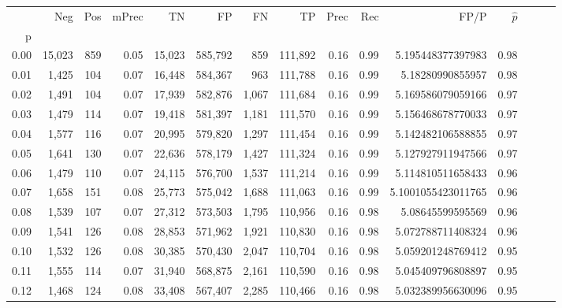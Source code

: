 \begin{tabular}{rrrrrrrrrrrrrrr}
\toprule
{} &     Neg &    Pos & mPrec &       TN &       FP &       FN &       TP &  Prec &   Rec &                 FP/P & $\hat{p}$ \\
p    &         &        &       &          &          &          &          &       &       &                      &           \\
\midrule
0.00 &  15,023 &    859 &  0.05 &   15,023 &  585,792 &      859 &  111,892 &  0.16 &  0.99 &    5.195448377397983 &      0.98 \\
0.01 &   1,425 &    104 &  0.07 &   16,448 &  584,367 &      963 &  111,788 &  0.16 &  0.99 &     5.18280990855957 &      0.98 \\
0.02 &   1,491 &    104 &  0.07 &   17,939 &  582,876 &    1,067 &  111,684 &  0.16 &  0.99 &    5.169586079059166 &      0.97 \\
0.03 &   1,479 &    114 &  0.07 &   19,418 &  581,397 &    1,181 &  111,570 &  0.16 &  0.99 &    5.156468678770033 &      0.97 \\
0.04 &   1,577 &    116 &  0.07 &   20,995 &  579,820 &    1,297 &  111,454 &  0.16 &  0.99 &    5.142482106588855 &      0.97 \\
0.05 &   1,641 &    130 &  0.07 &   22,636 &  578,179 &    1,427 &  111,324 &  0.16 &  0.99 &    5.127927911947566 &      0.97 \\
0.06 &   1,479 &    110 &  0.07 &   24,115 &  576,700 &    1,537 &  111,214 &  0.16 &  0.99 &    5.114810511658433 &      0.96 \\
0.07 &   1,658 &    151 &  0.08 &   25,773 &  575,042 &    1,688 &  111,063 &  0.16 &  0.99 &   5.1001055423011765 &      0.96 \\
0.08 &   1,539 &    107 &  0.07 &   27,312 &  573,503 &    1,795 &  110,956 &  0.16 &  0.98 &     5.08645599595569 &      0.96 \\
0.09 &   1,541 &    126 &  0.08 &   28,853 &  571,962 &    1,921 &  110,830 &  0.16 &  0.98 &    5.072788711408324 &      0.96 \\
0.10 &   1,532 &    126 &  0.08 &   30,385 &  570,430 &    2,047 &  110,704 &  0.16 &  0.98 &    5.059201248769412 &      0.95 \\
0.11 &   1,555 &    114 &  0.07 &   31,940 &  568,875 &    2,161 &  110,590 &  0.16 &  0.98 &    5.045409796808897 &      0.95 \\
0.12 &   1,468 &    124 &  0.08 &   33,408 &  567,407 &    2,285 &  110,466 &  0.16 &  0.98 &    5.032389956630096 &      0.95 \\

\end{tabular}
